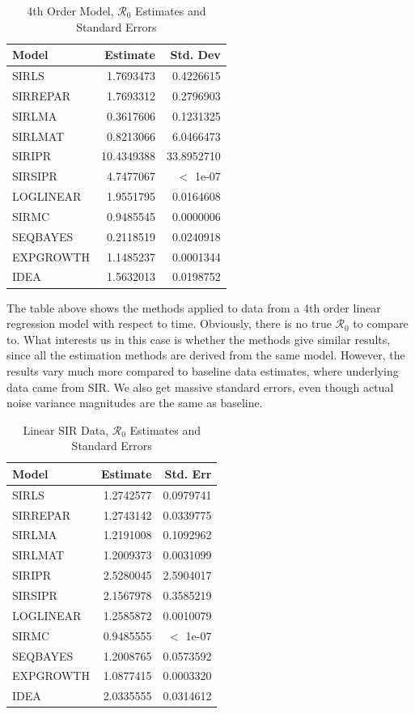 \documentclass[12pt]{article}
\newcommand{\rr}{\ensuremath{\mathcal{R}_0}}
\begin{document}
\begin{table}[H]


\centering
\begin{tabular}[t]{l|r|r}
	\hline
	Model & Estimate & Std. Dev\\
	\hline
	SIRLS & 1.7693473 & 0.4226615\\
	\hline
	SIRREPAR & 1.7693312 & 0.2796903\\
	\hline
	SIRLMA & 0.3617606 & 0.1231325\\
	\hline
	SIRLMAT & 0.8213066 & 6.0466473\\
	\hline
	SIRIPR & 10.4349388 & 33.8952710\\
	\hline
	SIRSIPR & 4.7477067 &  $<$ 1e-07\\
	\hline
	LOGLINEAR & 1.9551795 & 0.0164608\\
	\hline
	SIRMC & 0.9485545 & 0.0000006\\
	\hline
	SEQBAYES & 0.2118519 & 0.0240918\\
	\hline
	EXPGROWTH & 1.1485237 & 0.0001344\\
	\hline
	IDEA & 1.5632013 & 0.0198752\\
	\hline
\end{tabular}
\caption{\label{tab:f-ord} 4th Order Model, $\rr$ Estimates and Standard Errors}
\end{table}

The table above shows the methods applied to data from a 4th order linear regression model with respect to time. Obviously, there is no true $\rr$ to compare to. What interests us in this case is whether the methods give similar results, since all the estimation methods are derived from the same model. However, the results vary much more compared to baseline data estimates, where underlying data came from SIR. We also get massive standard errors, even though actual noise variance magnitudes are the same as baseline.

\begin{table}[H]
	
	\centering
	\begin{tabular}[t]{l|r|r}
		\hline
		Model & Estimate & Std. Err\\
		\hline
		SIRLS & 1.2742577 & 0.0979741\\
		\hline
		SIRREPAR & 1.2743142 & 0.0339775\\
		\hline
		SIRLMA & 1.2191008 & 0.1092962\\
		\hline
		SIRLMAT & 1.2009373 & 0.0031099\\
		\hline
		SIRIPR & 2.5280045 & 2.5904017\\
		\hline
		SIRSIPR & 2.1567978 & 0.3585219\\
		\hline
		LOGLINEAR & 1.2585872 & 0.0010079\\
		\hline
		SIRMC & 0.9485555 & $<$ 1e-07 \\
		\hline
		SEQBAYES & 1.2008765 & 0.0573592\\
		\hline
		EXPGROWTH & 1.0877415 & 0.0003320\\
		\hline
		IDEA & 2.0335555 & 0.0314612\\
		\hline
	\end{tabular}
	\caption{Linear SIR Data, $\rr$ Estimates and Standard Errors}\label{tab:lsir-res}
\end{table}
\end{document}
